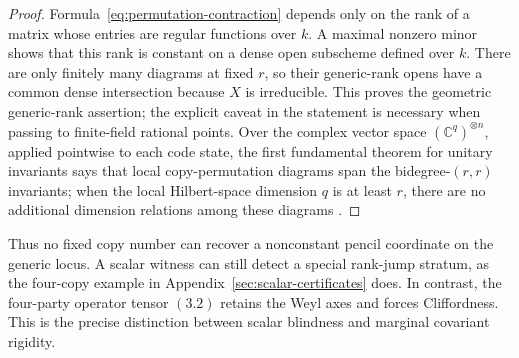 \begin{proof}
Formula~\eqref{eq:permutation-contraction} depends only on the rank of a
matrix whose entries are regular functions over \(k\).  A maximal nonzero
minor shows that this rank is constant on a dense open subscheme defined
over \(k\).  There are only finitely many diagrams at fixed \(r\), so
their generic-rank opens have a common dense intersection because \(X\)
is irreducible.  This proves the geometric generic-rank assertion; the
explicit caveat in the statement is necessary when passing to finite-field
rational points.  Over the complex vector space
\((\mathbb C^q)^{\otimes n}\), applied pointwise to each code state, the
first fundamental theorem for unitary invariants says that local
copy-permutation diagrams span the bidegree-\((r,r)\) invariants; when the
local Hilbert-space dimension \(q\) is at least \(r\), there are no
additional dimension relations among these diagrams
\cite[Section~2]{CollinsSniady2006}.
\end{proof}

Thus no fixed copy number can recover a nonconstant pencil coordinate on
the generic locus.  A scalar witness can still detect a special
rank-jump stratum, as the four-copy example in
Appendix~\ref{sec:scalar-certificates} does.  In contrast, the four-party
operator tensor \((3.2)\) retains the Weyl axes and forces Cliffordness.
This is the precise distinction between scalar blindness and marginal
covariant rigidity.
